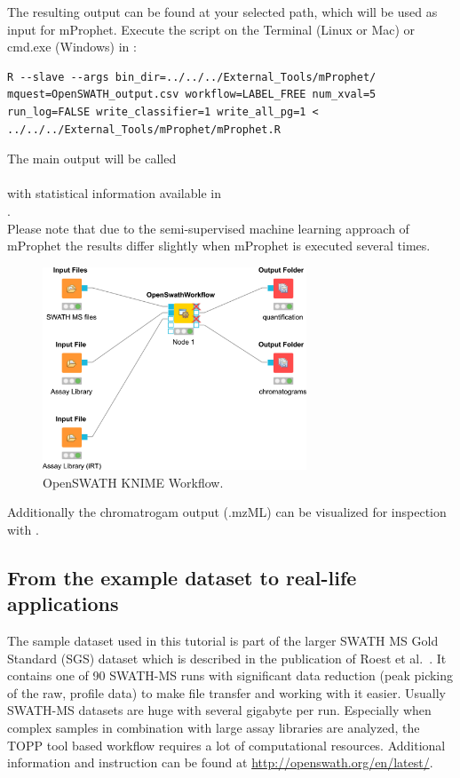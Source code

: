 The resulting output can be found at your selected path, which will be used as input for mProphet. Execute the script on the Terminal (Linux or Mac) or cmd.exe (Windows) in :

\begin{lstlisting}
R --slave --args bin_dir=../../../External_Tools/mProphet/ mquest=OpenSWATH_output.csv workflow=LABEL_FREE num_xval=5 run_log=FALSE write_classifier=1 write_all_pg=1 < ../../../External_Tools/mProphet/mProphet.R
\end{lstlisting}

The main output will be called\\
\\
with statistical information available in\\
.\\

Please note that due to the semi-supervised machine learning approach of mProphet the results differ slightly when mProphet is executed several times.

\begin{figure}[htbp]
  \includegraphics[width=0.7\textwidth]{graphics/openswath/OpenSWATHWF.png}
  \caption{OpenSWATH KNIME Workflow.}
  \label{fig:openswath}
\end{figure}

Additionally the chromatrogam output (.mzML) can be visualized for inspection with .

\subsection{From the example dataset to real-life applications}
The sample dataset used in this tutorial is part of the larger SWATH MS Gold Standard (SGS) dataset which is described in the publication of Roest et al.~\cite{Rost2014fd}.
It contains one of 90 SWATH-MS runs with significant data reduction (peak picking of the raw, profile data) to make file transfer and working with it easier. Usually SWATH-MS datasets are huge with several gigabyte per run. Especially when complex samples in combination with large assay libraries are analyzed, the TOPP tool based workflow requires a lot of computational resources. Additional information and instruction can be found at \url{http://openswath.org/en/latest/}.

